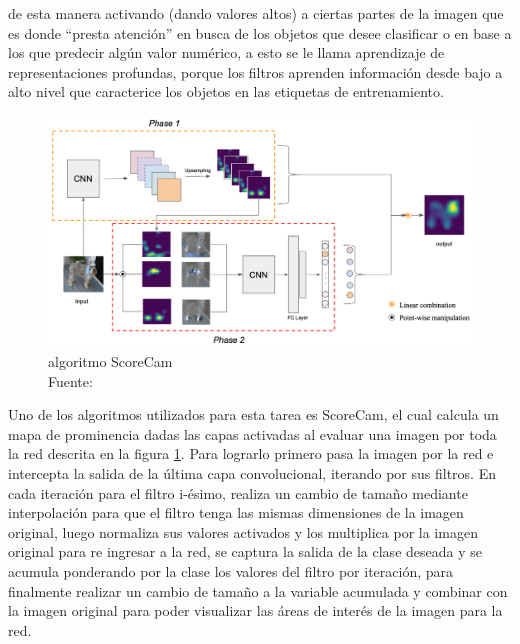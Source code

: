 	    
	    \noindent de esta manera activando (dando valores altos) a ciertas partes de la imagen que es donde ``presta atención'' en busca de los objetos que desee clasificar o en base a los que predecir algún valor numérico, a esto se le llama aprendizaje de representaciones profundas, porque los filtros aprenden información desde bajo a alto nivel que caracterice los objetos en las etiquetas de entrenamiento.
		
		\begin{figure}[H]
			\centering
			\includegraphics[scale=0.25]{imagenes/scorecam_net}
			\caption[Algoritmo ScoreCam]{algoritmo ScoreCam\\Fuente:\citep{Wang_2020_CVPR_Workshops}}\label{scorecam}
		\end{figure} 
		
		Uno de los algoritmos utilizados para esta tarea es ScoreCam, el cual calcula un mapa de prominencia dadas las capas activadas al evaluar una imagen por toda la red descrita en la figura \ref{scorecam}. Para lograrlo primero pasa la imagen por la red e intercepta la salida de la última capa convolucional, iterando por sus filtros. En cada iteración para el filtro i-ésimo, realiza un cambio de tamaño mediante interpolación para que el filtro tenga las mismas dimensiones de la imagen original, luego normaliza sus valores activados y los multiplica por la imagen original para re ingresar a la red, se captura la salida de la clase deseada y se acumula ponderando por la clase los valores del filtro por iteración, para finalmente realizar un cambio de tamaño a la variable acumulada y combinar con la imagen original para poder visualizar las áreas de interés de la imagen para la red.